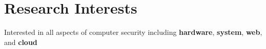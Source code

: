 \section*{Research Interests}
\begin{description}

\item Interested in
  all aspects of computer security including
  \textbf{hardware}, \textbf{system}, \textbf{web}, and \textbf{cloud}
\end{description}
